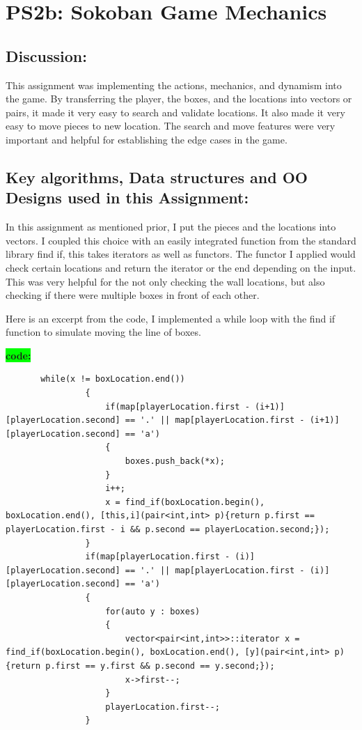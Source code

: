 \section{PS2b: Sokoban Game Mechanics}\label{sec:ps2b}
\graphicspath{{ps2b}}
\subsection{Discussion:}\label{sec:ps2b:disc}
This assignment was implementing the actions, mechanics, and dynamism into the game. By transferring the player, the boxes, and the locations into vectors or pairs, it made it very easy to search and validate locations. It also made it very easy to move pieces to new location. The search and move features were very important and helpful for establishing the edge cases in the game. 

\subsection{Key algorithms, Data structures and OO Designs used in this Assignment:}\label{sec:ps2b:kdo}
  In this assignment as mentioned prior, I put the pieces and the locations into vectors. I coupled this choice with an easily integrated function from the standard library find if, this takes iterators as well as functors. The functor I applied would check certain locations and return the iterator or the end depending on the input. This was very helpful for the not only checking the wall locations, but also checking if there were multiple boxes in front of each other. 
  
 Here is an excerpt from the code, I implemented a while loop with the find if function to simulate moving the line of boxes. 

              \textbf{\colorbox{lime}{ code:}}
       \begin{lstlisting}
       while(x != boxLocation.end())
                {
                    if(map[playerLocation.first - (i+1)][playerLocation.second] == '.' || map[playerLocation.first - (i+1)][playerLocation.second] == 'a')
                    {
                        boxes.push_back(*x);
                    }
                    i++;
                    x = find_if(boxLocation.begin(), boxLocation.end(), [this,i](pair<int,int> p){return p.first == playerLocation.first - i && p.second == playerLocation.second;});
                }
                if(map[playerLocation.first - (i)][playerLocation.second] == '.' || map[playerLocation.first - (i)][playerLocation.second] == 'a')
                {
                    for(auto y : boxes)
                    {
                        vector<pair<int,int>>::iterator x = find_if(boxLocation.begin(), boxLocation.end(), [y](pair<int,int> p){return p.first == y.first && p.second == y.second;});                        
                        x->first--;
                    }
                    playerLocation.first--;
                }

       \end{lstlisting}
